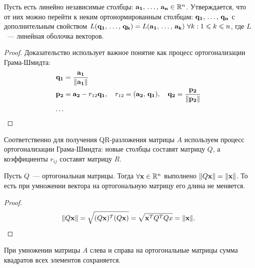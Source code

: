 \begin{claim}
    Пусть есть линейно независимые столбцы: $\mathbf{a_1},\,\ldots,\,\mathbf{a_n}\in\mathbb{R}^n$. Утверждается, что 
    от них можно перейти к неким ортонормированным столбцам: $\mathbf{q_1},\,\ldots,\,\mathbf{q_n}$ с дополнительным свойством
    $L(\vect{q_1},\,\ldots,\,\vect{q_k})=L(\vect{a_1},\,\ldots,\,\vect{a_k})\ \forall k: 1\leqslant k\leqslant n$, где $L$~--- линейная
    оболочка векторов.

    \begin{proof}
        Доказательство использует важное понятие как процесс ортогонализации Грама-Шмидта: 
        \begin{align*}
            \mathbf{q_1}&=\dfrac{\mathbf{a_1}}{\|\mathbf{a_1}\|}\\
            \mathbf{p_2}&=\mathbf{a_2}-r_{12}\mathbf{q_1},\quad r_{12}=(\mathbf{a_2},\,\mathbf{q_1}),\quad 
            \mathbf{q_2}=\dfrac{\mathbf{p_2}}{\|\mathbf{p_2}\|}\\
            \ldots
        \end{align*}

    \end{proof}
\end{claim}

\begin{remark}
    Соответственно для получения QR-разложения матрицы $A$ используем процесс ортогонализации Грама-Шмидта: 
    новые столбцы составят матрицу $Q$, а коэффициенты $r_{ij}$ составят матрицу $R$.
\end{remark}

\begin{claim}
    Пусть $Q$~--- ортогональная матрицы. Тогда $\forall \mathbf{x}\in\mathbb{R}^n$ выполнено $\|Q\mathbf{x}\|=\|\mathbf{x}\|$.
    То есть при умножении вектора на ортогональную матрицу его длина не меняется.

    \begin{proof}
        \[\|Q\mathbf{x}\|=\sqrt{(Q\mathbf{x})^T(Q\mathbf{x})}=\sqrt{\mathbf{x}^TQ^TQx}=\|\mathbf{x}\|.\]

    \end{proof}
\end{claim}

\begin{next0}
    При умножении матрицы $A$ слева и справа на ортогональные матрицы сумма квадратов всех элементов 
    сохраняется.
\end{next0}

